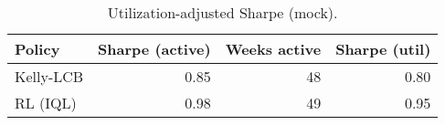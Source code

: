 \begin{table}[t]
  \centering
  \small
  \caption{Utilization-adjusted Sharpe (mock).}
  \begin{tabular}{lrrr}
    \toprule
    Policy & Sharpe (active) & Weeks active & Sharpe (util) \\
    \midrule
    Kelly-LCB & 0.85 & 48 & 0.80 \\
    RL (IQL)  & 0.98 & 49 & 0.95 \\
    \bottomrule
  \end{tabular}
\end{table}
